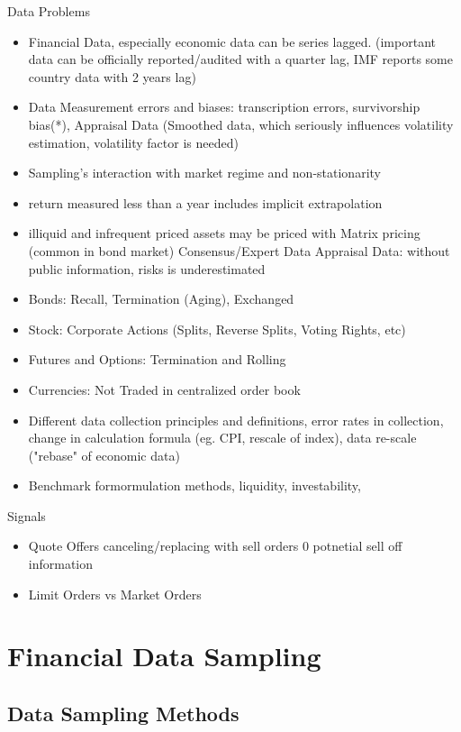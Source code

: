 \documentclass[11pt, openany]{book}              %
\begin{document}
Data Problems
\begin{itemize}
 \item Financial Data, especially economic data can be series lagged. (important data can be officially reported/audited with a quarter lag, IMF reports some country data with 2 years lag)
 \item Data Measurement errors and biases: transcription errors, survivorship bias(*), Appraisal Data (Smoothed data, which seriously influences volatility estimation, volatility factor is needed)
 \item Sampling's interaction with market regime and non-stationarity
 \item return measured less than a year includes implicit extrapolation
 \item illiquid and infrequent priced assets may be priced with
 	\subitem Matrix pricing (common in bond market)
 	\subitem Consensus/Expert Data
 	\subitem Appraisal Data: without public information, risks is underestimated 
 \item Bonds: Recall, Termination (Aging), Exchanged
 \item Stock: Corporate Actions (Splits, Reverse Splits, Voting Rights, etc)
 \item Futures and Options: Termination and Rolling
 \item Currencies: Not Traded in centralized order book 
 \item Different data collection principles and definitions, error rates in collection, change in calculation formula (eg. CPI, rescale of index), data re-scale ("rebase" of economic data)
 \item Benchmark formormulation methods, liquidity, investability,
\end{itemize}

Signals

\begin{itemize}
 \item Quote Offers canceling/replacing with sell orders 0 potnetial sell off information
 \item Limit Orders vs Market Orders 
\end{itemize}

\section{Financial Data Sampling}

\subsection{Data Sampling Methods}
\end{document}
